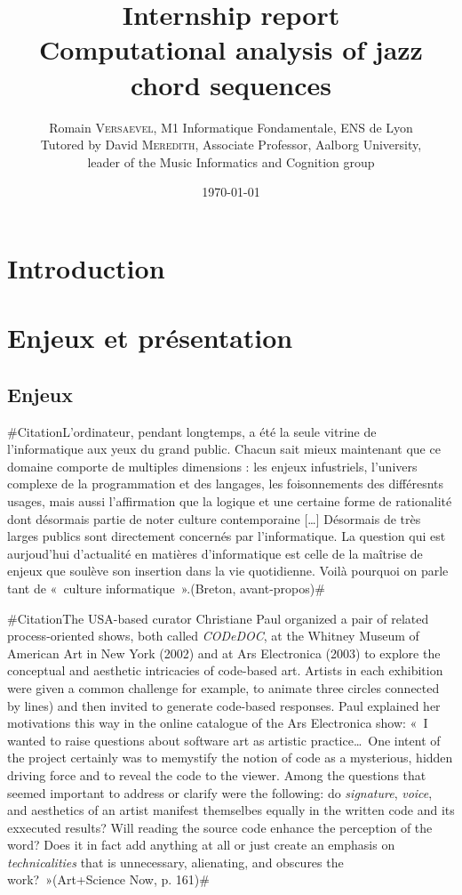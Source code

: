 \documentclass[a4paper,12pt]{article}
\title{\Large Internship report \\ \LARGE Computational analysis of jazz chord sequences}
\author{\normalsize Romain \textsc{Versaevel}, M1 Informatique Fondamentale, ENS de Lyon\\
\normalsize Tutored by David \textsc{Meredith}, Associate Professor, Aalborg University,\\
\normalsize leader of the Music Informatics and Cognition group\\}
\date{\today}
\newcommand{\guill}[1]{«~#1~»}
\newcommand{\zitat}[2]{\#Citation#1(#2)\#}
\begin{document}
\maketitle
\newpage

\tableofcontents

\newpage

\section{Introduction}

\section{Enjeux et présentation}

\subsection*{Enjeux}

\zitat{L'ordinateur, pendant longtemps, a été la seule vitrine de l'informatique aux yeux du grand public. Chacun sait mieux maintenant que ce domaine comporte de multiples dimensions : les enjeux infustriels, l'univers complexe de la programmation et des langages, les foisonnements des différesnts usages, mais aussi l'affirmation que la logique et une certaine forme de rationalité dont désormais partie de noter culture contemporaine [\dots]
Désormais de très larges publics sont directement concernés par l'informatique. La question qui est aurjoud'hui d'actualité en matières d'informatique est celle de la maîtrise de enjeux que soulève son insertion dans la vie quotidienne. Voilà pourquoi on parle tant de \guill{culture informatique}.}
{Breton, avant-propos}

\zitat{The USA-based curator Christiane Paul organized a pair of related process-oriented shows, both called \emph{CODeDOC}, at the Whitney Museum of American Art in New York (2002) and at Ars Electronica (2003) to explore the conceptual and aesthetic intricacies of code-based art. Artists in each exhibition were given a common challenge for example, to animate three circles connected by lines) and then invited to generate code-based responses. Paul explained her motivations this way in the online catalogue of the Ars Electronica show: \guill{I wanted to raise questions about software art as artistic practice\dots~One intent of the project certainly was to memystify the notion of code as a mysterious, hidden driving force and to reveal the code to the viewer. Among the questions that seemed important to address or clarify were the following: do \emph{signature}, \emph{voice}, and aesthetics of an artist manifest themselbes equally in the written code and its exxecuted results? Will reading the source code enhance the perception of the word? Does it in fact add anything at all or just create an emphasis on \emph{technicalities} that is unnecessary, alienating, and obscures the work?}}
{Art+Science Now, p. 161}
\end{document}

